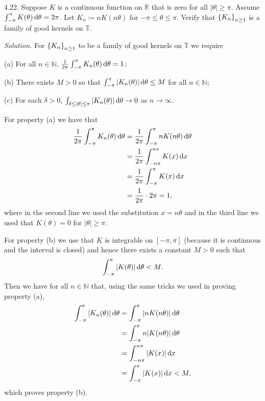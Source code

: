\documentclass{article}
\newcommand{\T}{\mathbb{T}}
\newcommand{\N}{\mathbb{N}}
\newcommand{\R}{\mathbb{R}}
\begin{document}
\newpage

4.22. Suppose $K$ is a continuous function on $\R$ that is zero for all
$|\theta| \geq \pi$. Assume $\int_{- \pi}^\pi K(\theta) \dif \theta = 2 \pi$.
Let $K_n \coloneqq n K(n \theta)$ for $- \pi \leq \theta \leq \pi$. Verify
that $\cbr{K_n}_{n \geq 1}$ is a family of good kernels on $\T$.

\textit{Solution.}
For $\cbr{K_n}_{n \geq 1}$ to be a family of good kernels on $\T$ we require

\begin{adjustwidth}{2.5em}{0pt}
    (a) For all $n \in \N$, $\frac{1}{2 \pi} \int_{- \pi}^\pi K_n(\theta) \dif \theta = 1$;

    (b) There exists $M > 0$ so that
    $\int_{- \pi}^\pi |K_n(\theta)| \dif \theta \leq M$ for all $n \in \N$;

    (c) For each $\delta > 0$,
    $\int_{\delta \leq |\theta| \leq \pi} |K_n(\theta)| \dif \theta \to 0$ as $n \to \infty$.
\end{adjustwidth}

For property (a) we have that
%
\begin{align*}
    \frac{1}{2 \pi} \int_{- \pi}^\pi K_n(\theta) \dif \theta
        &= \frac{1}{2 \pi} \int_{- \pi}^\pi n K(n \theta) \dif \theta \\
        &= \frac{1}{2 \pi} \int_{- n \pi}^{n \pi} K(x) \dif x \\
        &= \frac{1}{2 \pi} \int_{-\pi}^{\pi} K(x) \dif x \\
        &= \frac{1}{2 \pi} \cdot 2 \pi = 1
        ,
\end{align*}
%
where in the second line we used the substitution $x = n \theta$ and in
the third line we used that $K(\theta) = 0$ for $|\theta| \geq \pi$.

For property (b) we use that $K$ is integrable on $[-\pi, \pi]$ (because
it is continuous and the interval is closed) and hence there exists a
constant $M > 0$ such that
%
\begin{equation*}
    \int_{- \pi}^\pi |K(\theta)| \dif \theta < M
    .
\end{equation*}
%
Then we have for all $n \in \N$ that, using the same tricks we used
in proving property (a),
%
\begin{align*}
    \int_{- \pi}^\pi |K_n(\theta)| \dif \theta
        &= \int_{- \pi}^\pi |n K(n \theta)| \dif \theta \\
        &= \int_{- \pi}^\pi n |K(n \theta)| \dif \theta \\
        &= \int_{- n \pi}^{n \pi} |K(x)| \dif x \\
        &= \int_{-\pi}^{\pi} |K(x)| \dif x < M
        ,
\end{align*}
%
which proves property (b).
\end{document}
